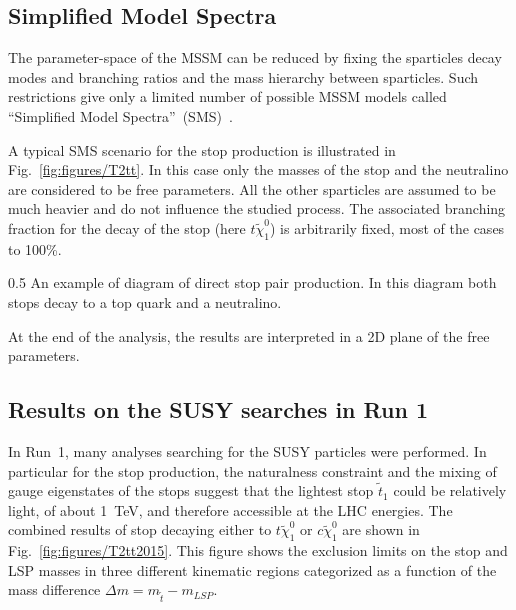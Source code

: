 




\subsection{Simplified Model Spectra~\label{sec:SMS}}

The parameter-space of the MSSM can be reduced by fixing the sparticles decay modes and branching ratios and the mass hierarchy between sparticles. Such restrictions give only a limited number of possible MSSM models called ``Simplified Model Spectra''~(SMS)~\cite{Alves:2011wf, Alwall:2008ag, Chatrchyan:2013sza}.

A typical SMS scenario for the stop production is illustrated in Fig.~\ref{fig:figures/T2tt}. In this case only the masses of the stop and the neutralino are considered to be free parameters. All the other sparticles are assumed to be much heavier and do not influence the studied process. The associated branching fraction for the decay of the stop (here $t \tilde{\chi}_{1}^0$) is arbitrarily fixed, most of the cases to 100\%.

                 {0.5}       %
                 { An example of diagram of direct stop pair production. In this diagram both stops decay to a top quark and a neutralino.} 


At the end of the analysis, the results are interpreted in a 2D plane of the free parameters.

\subsection{Results on the SUSY searches in Run 1}

In Run~1, many analyses searching for the SUSY particles were performed. In particular for the stop production, the naturalness constraint and the mixing of gauge eigenstates of the stops suggest that the lightest stop $\tilde{t}_{1}$ could be relatively light, of about 1~TeV, and therefore accessible at the LHC energies. The combined results of stop decaying either to $t \tilde{\chi}_{1}^0$ or $c \tilde{\chi}_{1}^0$ are shown in Fig.~\ref{fig:figures/T2tt2015}. This figure shows the exclusion limits on the stop and LSP masses in three different kinematic regions categorized as a function of the mass difference  $\Delta m = m_{\tilde{t}} - m_{LSP}$.


